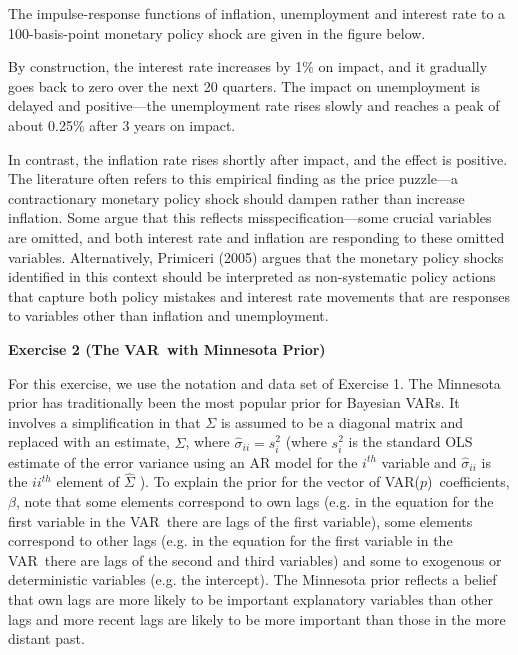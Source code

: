 \documentclass{article}
\begin{document}
The impulse-response functions of inflation, unemployment and interest rate
to a 100-basis-point monetary policy shock are given in the figure below.


By construction, the interest rate increases by 1\% on impact, and it
gradually goes back to zero over the next 20 quarters. The impact on
unemployment is delayed and positive---the unemployment rate rises slowly
and reaches a peak of about 0.25\% after 3 years on impact.

In contrast, the inflation rate rises shortly after impact, and the effect
is positive. The literature often refers to this empirical finding as the
price puzzle---a contractionary monetary policy shock should dampen rather
than increase inflation. Some argue that this reflects
misspecification---some crucial variables are omitted, and both interest
rate and inflation are responding to these omitted variables. Alternatively,
Primiceri (2005) argues that the monetary policy shocks identified in this
context should be interpreted as non-systematic policy actions that capture
both policy mistakes and interest rate movements that are responses to
variables other than inflation and unemployment.

\newpage

\textbf{Exercise 2 (The VAR\ with Minnesota Prior)}

For this exercise, we use the notation and data set of Exercise 1. The
Minnesota prior has traditionally been the most popular prior for Bayesian
VARs. It involves a simplification in that $\Sigma $ is assumed to be a
diagonal matrix and replaced with an estimate, $\widehat{\Sigma }$, where $%
\widehat{\sigma }_{ii}=s_{i}^{2}$ (where $s_{i}^{2}$ is the standard OLS
estimate of the error variance using an AR model for the $i^{th}$ variable
and $\widehat{\sigma }_{ii}$ is the $ii^{th}$ element of $\widehat{\Sigma }$%
). To explain the prior for the vector of VAR($p$)\ coefficients, $\beta $,
note that some elements correspond to own lags (e.g. in the equation for the
first variable in the VAR\ there are lags of the first variable), some
elements correspond to other lags (e.g. in the equation for the first
variable in the VAR\ there are lags of the second and third variables) and
some to exogenous or deterministic variables (e.g. the intercept). The
Minnesota prior reflects a belief that own lags are more likely to be
important explanatory variables than other lags and more recent lags are
likely to be more important than those in the more distant past.
\end{document}
